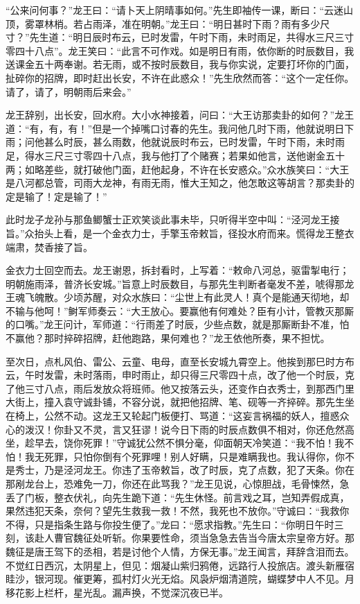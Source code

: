 \documentclass[12pt]{lsbook}
\begin{document}
“公来问何事？”龙王曰：“请卜天上阴晴事如何。”先生即袖传一课，断曰：“云迷山顶，雾罩林梢。若占雨泽，准在明朝。”龙王曰：“明日甚时下雨？雨有多少尺寸？”先生道：“明日辰时布云，已时发雷，午时下雨，未时雨足，共得水三尺三寸零四十八点”。龙王笑曰：“此言不可作戏。如是明日有雨，依你断的时辰数目，我送课金五十两奉谢。若无雨，或不按时辰数目，我与你实说，定要打坏你的门面，扯碎你的招牌，即时赶出长安，不许在此惑众！”先生欣然而答：“这个一定任你。请了，请了，明朝雨后来会。”

龙王辞别，出长安，回水府。大小水神接着，问曰：“大王访那卖卦的如何？”龙王道：“有，有，有！”但是一个掉嘴口讨春的先生。我问他几时下雨，他就说明日下雨；问他甚么时辰，甚么雨数，他就说辰时布云，已时发雷，午时下雨，未时雨足，得水三尺三寸零四十八点，我与他打了个赌赛；若果如他言，送他谢金五十两；如略差些，就打破他门面，赶他起身，不许在长安惑众。”众水族笑曰：“大王是八河都总管，司雨大龙神，有雨无雨，惟大王知之，他怎敢这等胡言？那卖卦的定是输了！定是输了！”

此时龙子龙孙与那鱼鲫蟹士正欢笑谈此事未毕，只听得半空中叫：“泾河龙王接旨。”众抬头上看，是一个金衣力士，手擎玉帝敕旨，径投水府而来。慌得龙王整衣端肃，焚香接了旨。

金衣力士回空而去。龙王谢恩，拆封看时，上写着：“敕命八河总，驱雷掣电行；明朝施雨泽，普济长安城。”旨意上时辰数目，与那先生判断者毫发不差，唬得那龙王魂飞魄散。少顷苏醒，对众水族曰：“尘世上有此灵人！真个是能通天彻地，却不输与他呵！”鲥军师奏云：“大王放心。要赢他有何难处？臣有小计，管教灭那厮的口嘴。”龙王问计，军师道：“行雨差了时辰，少些点数，就是那厮断卦不准，怕不赢他？那时捽碎招牌，赶他跑路，果何难也？”龙王依他所奏，果不担忧。

至次日，点札风伯、雷公、云童、电母，直至长安城九霄空上。他挨到那巳时方布云，午时发雷，未时落雨，申时雨止，却只得三尺零四十点，改了他一个时辰，克了他三寸八点，雨后发放众将班师。他又按落云头，还变作白衣秀士，到那西门里大街上，撞入袁守诚卦铺，不容分说，就把他招牌、笔、砚等一齐捽碎。那先生坐在椅上，公然不动。这龙王又轮起门板便打、骂道：“这妄言祸福的妖人，擅惑众心的泼汉！你卦又不灵，言又狂谬！说今日下雨的时辰点数俱不相对，你还危然高坐，趁早去，饶你死罪！”守诚犹公然不惧分毫，仰面朝天冷笑道：“我不怕！我不怕！我无死罪，只怕你倒有个死罪哩！别人好瞒，只是难瞒我也。我认得你，你不是秀士，乃是泾河龙王。你违了玉帝敕旨，改了时辰，克了点数，犯了天条。你在那剐龙台上，恐难免一刀，你还在此骂我？”龙王见说，心惊胆战，毛骨悚然，急丢了门板，整衣伏礼，向先生跪下道：“先生休怪。前言戏之耳，岂知弄假成真，果然违犯天条，奈何？望先生救我一救！不然，我死也不放你。”守诚曰：“我救你不得，只是指条生路与你投生便了。”龙曰：“愿求指教。”先生曰：“你明日午时三刻，该赴人曹官魏征处听斩。你果要性命，须当急急去告当今唐太宗皇帝方好。那魏征是唐王驾下的丞相，若是讨他个人情，方保无事。”龙王闻言，拜辞含泪而去。不觉红日西沉，太阴星上，但见：烟凝山紫归鸦倦，远路行人投旅店。渡头新雁宿眭沙，银河现。催更筹，孤村灯火光无焰。风袅炉烟清道院，蝴蝶梦中人不见。月移花影上栏杆，星光乱。漏声换，不觉深沉夜已半。
\end{document}
